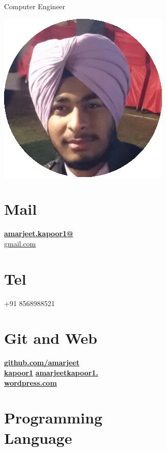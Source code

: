 \documentclass[]{friggeri-cv}
\begin{document}
      {Computer Engineer}
      

\begin{aside}
\includegraphics[scale=0.30]{amar.png}
      \section{Mail}
    \href{mailto:amarjeet.kapoor1@gmail.com}{\textbf{amarjeet.kapoor1@}\\gmail.com}
  \section{Tel}
    +91 8568988521
  \section{Git and Web}
    \href{http://github.com/amarjeetkapoor1}{\textbf{github.com/amarjeet \\ kapoor1}}
    \href{http://amarjeetkapoor1.wordpress.com}{\textbf{amarjeetkapoor1.\\wordpress.com}}
  \section{Programming \\ Language}
    ~

\end{aside}
\end{document}
